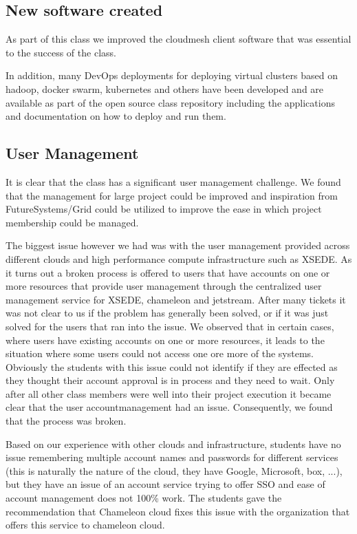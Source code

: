 \documentclass[sigconf]{acmart}
\begin{document}
\subsection{New software created}

As part of this class we improved the cloudmesh client software
\cite{www-cloudmesh-client}\cite{www-cloudmesh-cmd5}
\cite{www-cloudmesh-rest} that was essential to the success of the
class.

In addition, many DevOps deployments for deploying virtual clusters
based on hadoop, docker swarm, kubernetes and others have been
developed and are available as part of the open source class repository
including the applications and documentation on how to deploy and run
them.

\subsection{User Management}

It is clear that the class has a significant user management
challenge. We found that the management for large project could be
improved and inspiration from FutureSystems/Grid could be utilized to
improve the ease in which project membership could be managed.

The biggest issue however we had was with the user management provided
across different clouds and high performance compute infrastructure
such as XSEDE. As it turns out a broken process is offered to users
that have accounts on one or more resources that provide user
management through the centralized user management service for XSEDE,
chameleon and jetstream. After many tickets it was not clear to us if
the problem has generally been solved, or if it was just solved for
the users that ran into the issue. We observed that in certain cases,
where users have existing accounts on one or more resources, it leads
to the situation where some users could not access one ore more of the
systems. Obviously the students with this issue could not identify if
they are effected as they thought their account approval is in process
and they need to wait. Only after all other class members were well
into their project execution it became clear that the user
accountmanagement had an issue. Consequently, we found that the
process was broken.

Based on our experience with other clouds and infrastructure, students
have no issue remembering multiple account names and passwords for
different services (this is naturally the nature of the cloud, they
have Google, Microsoft, box, ...), but they have an issue of an
account service trying to offer SSO and ease of account management
does not 100\% work. The students gave the recommendation that
Chameleon cloud fixes this issue with the organization that offers
this service to chameleon cloud.
\end{document}
